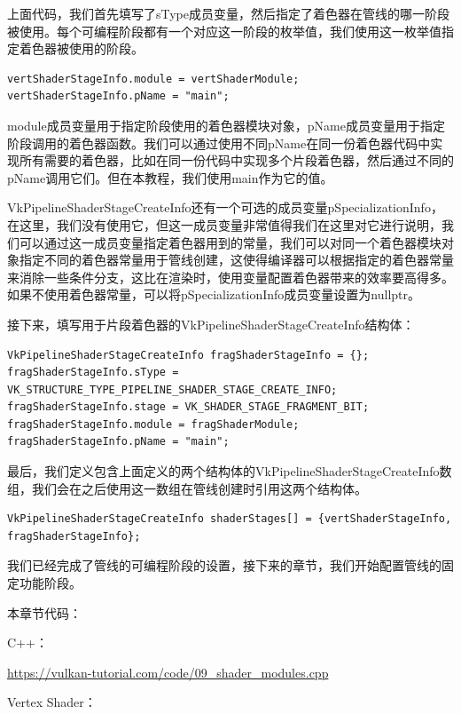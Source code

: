 \documentclass{ctexart}
\begin{document}
上面代码，我们首先填写了sType成员变量，然后指定了着色器在管线的哪一阶段被使用。每个可编程阶段都有一个对应这一阶段的枚举值，我们使用这一枚举值指定着色器被使用的阶段。

\begin{lstlisting}[language={[ANSI]C}]
vertShaderStageInfo.module = vertShaderModule;
vertShaderStageInfo.pName = "main";
\end{lstlisting}

module成员变量用于指定阶段使用的着色器模块对象，pName成员变量用于指定阶段调用的着色器函数。我们可以通过使用不同pName在同一份着色器代码中实现所有需要的着色器，比如在同一份代码中实现多个片段着色器，然后通过不同的pName调用它们。但在本教程，我们使用main作为它的值。

VkPipelineShaderStageCreateInfo还有一个可选的成员变量pSpecializationInfo，在这里，我们没有使用它，但这一成员变量非常值得我们在这里对它进行说明，我们可以通过这一成员变量指定着色器用到的常量，我们可以对同一个着色器模块对象指定不同的着色器常量用于管线创建，这使得编译器可以根据指定的着色器常量来消除一些条件分支，这比在渲染时，使用变量配置着色器带来的效率要高得多。如果不使用着色器常量，可以将pSpecializationInfo成员变量设置为nullptr。

接下来，填写用于片段着色器的VkPipelineShaderStageCreateInfo结构体：

\begin{lstlisting}[language={[ANSI]C}]
VkPipelineShaderStageCreateInfo fragShaderStageInfo = {};
fragShaderStageInfo.sType = VK_STRUCTURE_TYPE_PIPELINE_SHADER_STAGE_CREATE_INFO;
fragShaderStageInfo.stage = VK_SHADER_STAGE_FRAGMENT_BIT;
fragShaderStageInfo.module = fragShaderModule;
fragShaderStageInfo.pName = "main";
\end{lstlisting}

最后，我们定义包含上面定义的两个结构体的VkPipelineShaderStageCreateInfo数组，我们会在之后使用这一数组在管线创建时引用这两个结构体。

\begin{lstlisting}[language={[ANSI]C}]
VkPipelineShaderStageCreateInfo shaderStages[] = {vertShaderStageInfo, fragShaderStageInfo};
\end{lstlisting}

我们已经完成了管线的可编程阶段的设置，接下来的章节，我们开始配置管线的固定功能阶段。

本章节代码：

C++：

\url{https://vulkan-tutorial.com/code/09_shader_modules.cpp}

Vertex Shader：
\end{document}
